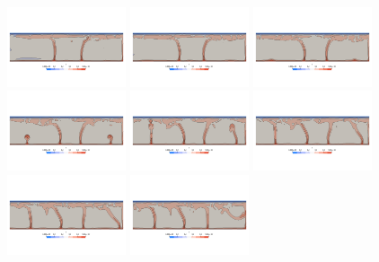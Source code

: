 \begin{center}
\includegraphics[width=3.5cm]{python_codes/fieldstone_88/results/model2/T0007.png}
\includegraphics[width=3.5cm]{python_codes/fieldstone_88/results/model2/T0008.png}
\includegraphics[width=3.5cm]{python_codes/fieldstone_88/results/model2/T0009.png}\\
\includegraphics[width=3.5cm]{python_codes/fieldstone_88/results/model2/T0010.png}
\includegraphics[width=3.5cm]{python_codes/fieldstone_88/results/model2/T0011.png}
\includegraphics[width=3.5cm]{python_codes/fieldstone_88/results/model2/T0012.png}
\includegraphics[width=3.5cm]{python_codes/fieldstone_88/results/model2/T0013.png}
\includegraphics[width=3.5cm]{python_codes/fieldstone_88/results/model2/T0014.png}\\

\end{center}
